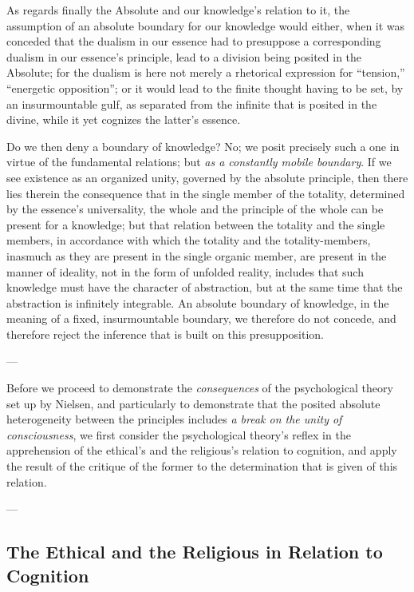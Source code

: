 \documentclass[12pt,a4paper]{book}
\begin{document}
As regards finally the Absolute and our knowledge's relation to it, the assumption of an absolute boundary
for our knowledge would either, when it was conceded that the dualism in our essence had to presuppose a
corresponding dualism in our essence's principle, lead to a division being posited in the Absolute; for the
dualism is here not merely a rhetorical expression for ``tension,'' ``energetic opposition''; or it would
lead to the finite thought having to be set, by an insurmountable gulf, as separated from the infinite that
is posited in the divine, while it yet cognizes the latter's essence.

Do we then deny a boundary of knowledge? No; we posit precisely such a one in virtue of the fundamental
relations; but \emph{as a constantly mobile boundary}. If we see existence as an organized unity, governed
by the absolute principle, then there lies therein the consequence that in the single member of the
totality, determined by the essence's universality, the whole and the principle of the whole can be present
for a knowledge; but that relation between the totality and the single members, in accordance with which
the totality and the totality-members, inasmuch as they are present in the single organic member, are
present in the manner of ideality, not in the form of unfolded reality, includes that such knowledge must
have the character of abstraction, but at the same time that the abstraction is infinitely integrable. An
absolute boundary of knowledge, in the meaning of a fixed, insurmountable boundary, we therefore do not
concede, and therefore reject the inference that is built on this presupposition.

\begin{center}---\end{center}

Before we proceed to demonstrate the \emph{consequences} of the psychological theory set up by Nielsen, and
particularly to demonstrate that the posited absolute heterogeneity between the principles includes \emph{a
break on the unity of consciousness}, we first consider the psychological theory's reflex in the
apprehension of the ethical's and the religious's relation to cognition, and apply the result of the
critique of the former to the determination that is given of this relation.

\begin{center}---\end{center}

\subsection{The Ethical and the Religious in Relation to Cognition}
\label{ssec:ethical-religious}
\end{document}
